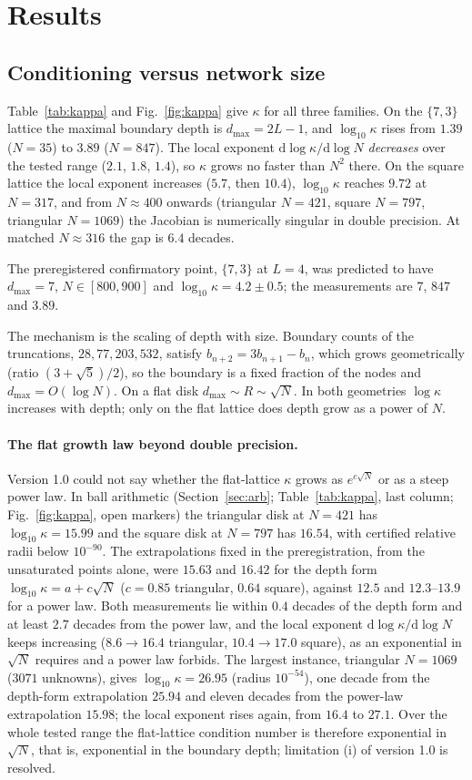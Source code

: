 \documentclass[11pt,a4paper]{article}
\newcommand{\ARBLARGE}{The largest instance, triangular $N=1069$ ($3071$ unknowns), gives $\log_{10}\kappa=26.95$
(radius $10^{-54}$), one decade from the depth-form extrapolation $25.94$ and eleven decades from the power-law
extrapolation $15.98$; the local exponent rises again, from $16.4$ to $27.1$.}
\begin{document}


\section{Results}

\subsection{Conditioning versus network size}
\label{sec:cond}
Table~\ref{tab:kappa} and Fig.~\ref{fig:kappa} give $\kappa$ for all three families. On the $\{7,3\}$ lattice the
maximal boundary depth is $d_{\max}=2L-1$, and $\log_{10}\kappa$ rises from $1.39$ ($N=35$) to $3.89$ ($N=847$).
The local exponent $\mathrm{d}\log\kappa/\mathrm{d}\log N$ \emph{decreases} over the tested range ($2.1$, $1.8$,
$1.4$), so $\kappa$ grows no faster than $N^{2}$ there. On the square lattice the local exponent increases ($5.7$,
then $10.4$), $\log_{10}\kappa$ reaches $9.72$ at $N=317$, and from $N\approx400$ onwards (triangular $N=421$,
square $N=797$, triangular $N=1069$) the Jacobian is numerically singular in double precision. At matched
$N\approx316$ the gap is $6.4$ decades.

The preregistered confirmatory point, $\{7,3\}$ at $L=4$, was predicted to have $d_{\max}=7$,
$N\in[800,900]$ and $\log_{10}\kappa = 4.2\pm0.5$; the measurements are $7$, $847$ and $3.89$.

The mechanism is the scaling of depth with size. Boundary counts of the truncations, $28, 77, 203, 532$, satisfy
$b_{n+2} = 3b_{n+1}-b_n$, which grows geometrically (ratio $(3+\sqrt5)/2$), so the boundary is a fixed fraction of
the nodes and $d_{\max}=O(\log N)$. On a flat disk $d_{\max}\sim R\sim\sqrt N$. In both geometries $\log\kappa$
increases with depth; only on the flat lattice does depth grow as a power of $N$.

\paragraph{The flat growth law beyond double precision.}
Version 1.0 could not say whether the flat-lattice $\kappa$ grows as $e^{c\sqrt N}$ or as a steep power law. In ball
arithmetic (Section~\ref{sec:arb}; Table~\ref{tab:kappa}, last column; Fig.~\ref{fig:kappa}, open markers) the
triangular disk at $N=421$ has $\log_{10}\kappa=15.99$ and the square disk at $N=797$ has $16.54$, with certified
relative radii below $10^{-90}$. The extrapolations fixed in the preregistration, from the unsaturated points alone,
were $15.63$ and $16.42$ for the depth form $\log_{10}\kappa=a+c\sqrt N$ ($c=0.85$ triangular, $0.64$ square), against
$12.5$ and $12.3$--$13.9$ for a power law. Both measurements lie within $0.4$ decades of the depth form and at least
$2.7$ decades from the power law, and the local exponent $\mathrm d\log\kappa/\mathrm d\log N$ keeps increasing
($8.6\to16.4$ triangular, $10.4\to17.0$ square), as an exponential in $\sqrt N$ requires and a power law forbids.
\ARBLARGE
Over the whole tested range the flat-lattice condition number is therefore exponential in $\sqrt N$, that is,
exponential in the boundary depth; limitation (i) of version 1.0 is resolved.
\end{document}
